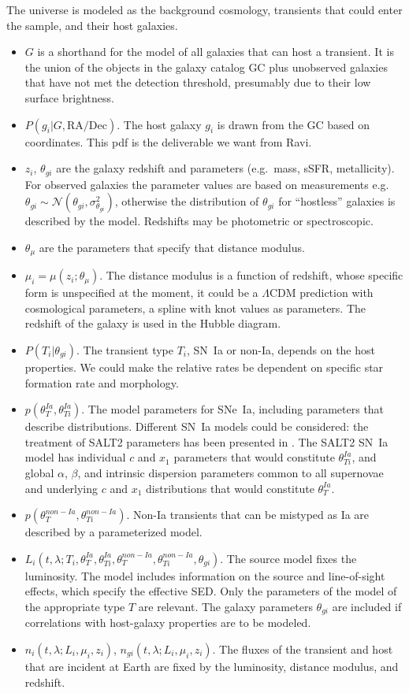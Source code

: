 \documentclass[preprint]{aastex}
\begin{document}
The universe is modeled as the background cosmology, transients that could
enter the sample, and their host galaxies.
\begin{itemize}
\item $G$ is a shorthand for the model of all galaxies that can host a transient.  It is
the union of the objects in the galaxy catalog GC
plus unobserved galaxies that have not
met the detection threshold, presumably due to their low surface brightness.
\item $P(g_i | G, {\text{RA}}/{\text{Dec}})$. The host galaxy $g_i$
is drawn from the GC based on coordinates.
This pdf is
the deliverable we want from Ravi.
\item $z_i$, $\theta_{gi}$ are the galaxy redshift and parameters (e.g.\ mass, sSFR, metallicity).
For observed galaxies the parameter values are based on measurements e.g.\ $\theta_{gi} \sim \mathcal{N}({\theta}_{gi},\sigma^2_{{\theta}_{gi}})$, otherwise the distribution
of $\theta_{gi}$ for ``hostless'' galaxies is described by the model.
Redshifts may be photometric or spectroscopic.
\item $\theta_\mu$ are the parameters that specify that distance modulus.
\item $\mu_i=\mu(z_i; \theta_\mu)$.  The distance modulus is a function of redshift,
whose specific form is unspecified at the moment,  it could
be a $\Lambda$CDM prediction with cosmological parameters, a spline with knot values
as parameters.
The redshift of the galaxy is used in the Hubble diagram.
\item $P(T_i | \theta_{gi})$.  The transient type $T_i$, SN~Ia or non-Ia, depends
on the host properties.  We could make the relative rates be dependent
on specific star formation rate and morphology.
\item $p(\theta_T^{Ia}, \theta_{Ti}^{Ia})$.  The model parameters for SNe~Ia, including
parameters that describe distributions.
Different SN~Ia models could be considered: the treatment of SALT2 parameters
has been presented in \citet{2011MNRAS.418.2308M}.
The SALT2 SN~Ia
model has individual $c$ and $x_1$ parameters that would constitute $\theta_{Ti}^{Ia}$,
and global $\alpha$, $\beta$, and intrinsic dispersion  parameters  common to all supernovae
 and  underlying  $c$ and $x_1$ distributions that would constitute $\theta_T^{Ia}$.
\item $p(\theta_T^{non-Ia}, \theta_{Ti}^{non-Ia})$.  Non-Ia transients
that can be mistyped as Ia are described by a parameterized model.
\item $L_i(t,\lambda; T_i, \theta_T^{Ia}, \theta_{Ti}^{Ia}, \theta_T^{non-Ia}, \theta_{Ti}^{non-Ia},
\theta_{gi})$.  The source model fixes
the luminosity. The  model includes  information on the
source and line-of-sight effects, which specify the effective SED.   Only the
parameters of the model of the appropriate type $T$ are relevant.  The galaxy parameters
$\theta_{gi}$ are included if correlations with host-galaxy properties are to be modeled.
\item $n_i(t,\lambda; L_i, \mu_i, z_i)$, $n_{gi}(t,\lambda; L_i, \mu_i, z_i)$.  The  fluxes of
the transient and host that are incident at Earth
are fixed by the luminosity, distance modulus, and redshift.
\end{itemize}
\end{document}
